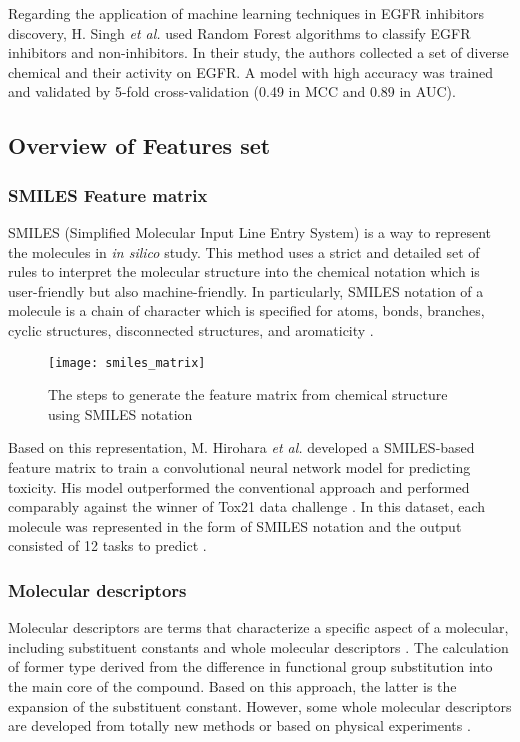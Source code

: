 \documentclass[conference]{IEEEtran}
\begin{document}
Regarding the application of machine learning techniques in EGFR inhibitors discovery, H. Singh \textit{et al.} \cite{Singh2015} used Random Forest algorithms to classify EGFR inhibitors and non-inhibitors. In their study, the authors collected a set of diverse chemical and their activity on EGFR. A model with high accuracy was trained and validated by 5-fold cross-validation (0.49 in MCC and 0.89 in AUC). 
\subsection{Overview of Features set}
\subsubsection{SMILES Feature matrix}
SMILES (Simplified Molecular Input Line Entry System) is a way to represent the molecules in \textit{in silico} study. This method uses a strict and detailed set of rules to interpret the molecular structure into the chemical notation which is user-friendly but also machine-friendly. In particularly, SMILES notation of a molecule is a chain of character which is specified for atoms, bonds, branches, cyclic structures, disconnected structures, and aromaticity \cite{Weininger1988}.

\begin{figure}[htbp]
    \centering
    \texttt{[image: smiles\_matrix]}
    \caption{The steps to generate the feature matrix from chemical structure using SMILES notation}
    \label{fig:smilesmatrix}
\end{figure}

Based on this representation, M. Hirohara \textit{et al.} developed a SMILES-based feature matrix to train a convolutional neural network model for predicting toxicity. His model outperformed the conventional approach and performed comparably against the winner of Tox21 data challenge \cite{Hirohara2018}. In this dataset, each molecule was represented in the form of SMILES notation and the output consisted of 12 tasks to predict \cite{tox21}.

\subsubsection{Molecular descriptors}
Molecular descriptors are terms that characterize a specific aspect of a molecular, including substituent constants and whole molecular descriptors \cite{Of2011}. The calculation of former type derived from the difference in functional group substitution into the main core of the compound. Based on this approach, the latter is the expansion of the substituent constant. However, some whole molecular descriptors are developed from totally new methods or based on physical experiments \cite{Roy2015}. 
\end{document}
